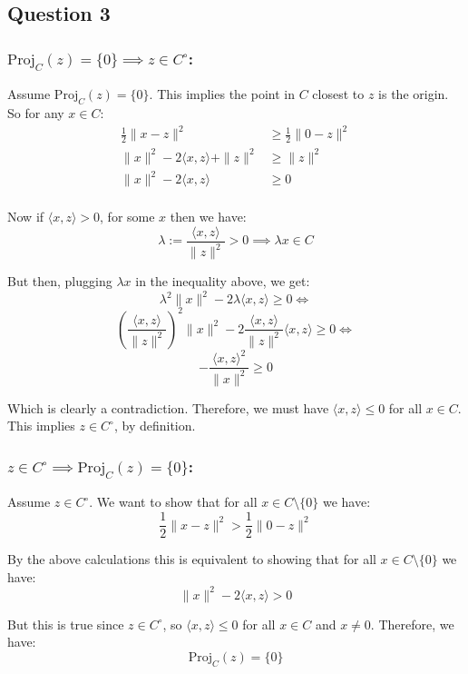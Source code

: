 \documentclass[12p]{article}
\newcommand*{\proj}{\text{Proj}}
\begin{document}
\subsection*{Question 3} 

\subsubsection*{\textbf{\( \text{Proj}_C(z) = \{0\} \implies z \in C^\circ \):}}\hfil\par 
Assume \( \text{Proj}_C(z) = \{0\} \). This implies the point in \( C \) closest to \( z \) is the origin. So for any \( x \in C \):
 \begin{align*}
        \frac{1}{2} \|x - z\|^2 &\geq \frac{1}{2} \|0 - z\|^2 \\
        \|x\|^2-2\langle x, z\rangle +\|z\|^2 &\geq \|z\|^2 \\
        \|x\|^2  -2\langle x, z\rangle &\geq 0\\
 \end{align*}

 Now if \(\langle x, z\rangle > 0\), for some \(x\) then we have:
 \[
   \lambda:=\frac{\langle x, z\rangle}{\|z\|^2}>0\implies \lambda x\in C 
 \]

 But then, plugging \(\lambda x\) in the inequality above, we get:
\[
    \lambda^2\|x\|^2-2\lambda\langle x, z\rangle \geq 0\iff      
\]
\[
    \left(\frac{\langle x, z\rangle}{\|z\|^2}\right)^2\|x\|^2-2\frac{\langle x, z\rangle}{\|z\|^2}\langle x, z\rangle \geq 0\iff
\]
\[
  -\frac{\langle x, z\rangle^2 }{\|x\|^2} \geq 0 
\]

Which is clearly a contradiction. Therefore, we must have \(\langle x, z\rangle \leq 0\) for all \(x\in C\). This implies \(z\in C^\circ\), by definition.
\subsubsection*{\( z \in C^\circ  \implies \text{Proj}_C(z) = \{0\} \):}\hfil\par
Assume \( z \in C^\circ \). We want to show that for all \(x\in C\setminus\{0\}\) we have: 
\[
    \frac{1}{2} \|x - z\|^2 > \frac{1}{2} \|0 - z\|^2 
\]

By the above calculations this is equivalent to showing that for all \(x\in C\setminus\{0\}\) we have:
\[
    \|x\|^2  -2\langle x, z\rangle > 0  
\]

But this is true since \(z\in C^\circ\), so \(\langle x, z\rangle\leq 0\) for all \(x\in C\) and \(x\neq 0\). Therefore, we have:
\[
  \proj_C(z)=\{0\}  
\]
\end{document}
